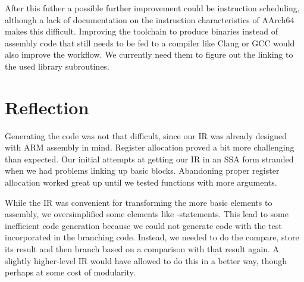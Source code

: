 After this futher a possible further improvement could be instruction scheduling, although a lack of documentation on the instruction characteristics of AArch64 makes this difficult.
Improving the toolchain to produce binaries instead of assembly code that still needs to be fed to a compiler like Clang or GCC would also improve the workflow.
We currently need them to figure out the linking to the used library subroutines.

\section{Reflection}

Generating the code was not that difficult, since our IR was already designed with ARM assembly in mind.
Register allocation proved a bit more challenging than expected.
Our initial attempts at getting our IR in an SSA form stranded when we had problems linking up basic blocks.
Abandoning proper register allocation worked great up until we tested functions with more arguments.

While the IR was convenient for transforming the more basic elements to assembly, we oversimplified some elements like -statements.
This lead to some inefficient code generation because we could not generate code with the test incorporated in the branching code.
Instead, we needed to do the compare, store its result and then branch based on a comparison with that result again.
A slightly higher-level IR would have allowed to do this in a better way, though perhaps at some cost of modularity.

